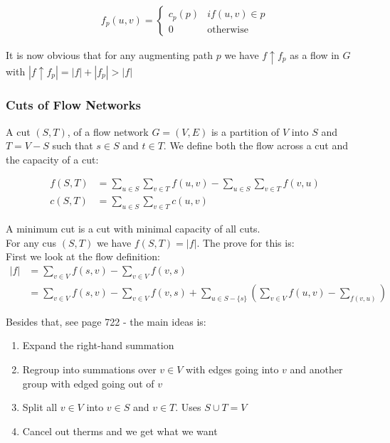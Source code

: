 \documentclass[12pt]{article}
\begin{document}
\begin{align}
 f_p(u, v) =
  \begin{cases}
  	c_p(p) & if (u, v) \in p \\
  	0 & \text{otherwise}
  \end{cases}
\end{align}

It is now obvious that for any augmenting path $p$ we have $f \uparrow f_p$ as a flow in $G$ with $|f \uparrow f_p| = |f| + |f_p| > |f|$
%
\subsubsection{Cuts of Flow Networks}
A cut $(S, T)$, of a flow network $G = (V, E)$ is a partition of $V$ into $S$ and $T = V - S$ such that $s \in S$ and $t \in T$. We define both the flow across a cut and the capacity of a cut:

\begin{align}
f(S, T) &= \sum_{u \in S} \sum_{v \in T} f(u, v) - \sum_{u \in S} \sum_{v \in T} f(v, u)\\
c(S, T) &= \sum_{u \in S} \sum_{v \in T} c(u, v)
\end{align}

A minimum cut is a cut with minimal capacity of all cuts. \\
For any cus $(S, T)$ we have $f(S, T) = |f|$. The prove for this is:\\

First we look at the flow definition:
\begin{align*}
|f| &= \sum_{v \in V} f(s, v) - \sum_{v \in V} f(v, s)\\
&= \sum_{v \in V} f(s, v) - \sum_{v \in V} f(v, s) + \sum_{u \in S - \{s\}} \left ( \sum_{v \in V} f(u, v) - \sum_{f(v, u)}\right)
\end{align*}

Besides that, see page 722 - the main ideas is: 

\begin{enumerate}
	\item Expand the right-hand summation 
	\item Regroup into summations over $v \in V$ with edges going into $v$ and another group with edged going out of $v$
	\item Split all $v \in V$ into $v \in S$ and $v \in T$. Uses $S \cup T = V$
	\item Cancel out therms and we get what we want
\end{enumerate}
\end{document}
